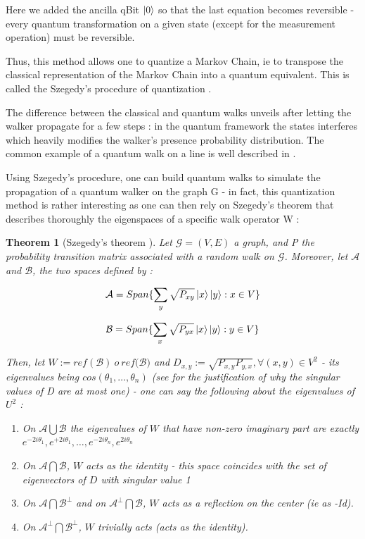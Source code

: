 \documentclass[sn-mathphys]{sn-jnl}%
\theoremstyle{thmstyleone}%
\newtheorem{theo}{Theorem}[section]
\theoremstyle{thmstyletwo}%
\theoremstyle{thmstylethree}%
\begin{document}
Here we added the ancilla qBit $\ket{0}$ so that the last equation
becomes reversible - every quantum transformation on a given state
(except for the measurement operation) must be reversible.

Thus, this method allows one to quantize a Markov Chain, ie to
transpose the classical representation of the Markov Chain into a
quantum equivalent. This is called the Szegedy's procedure of
quantization \cite{szegedy}.

The difference between the classical and quantum walks unveils after
letting the walker propagate for a few steps : in the quantum
framework the states interferes which heavily modifies the walker's
presence probability distribution. The common example of a quantum
walk on a line is well described in \cite{kempe_2009}.

Using Szegedy's procedure, one can build quantum walks to simulate the
propagation of a quantum walker on the graph G - in fact, this
quantization method is rather interesting as one can then rely on
Szegedy's theorem that describes thoroughly the eigenspaces of a
specific walk operator W :

\begin{theo}[Szegedy's theorem \cite{szegedy}]
  Let $\mathcal{G}=(V,E)$ a graph, and P the probability transition
  matrix associated with a random walk on $\mathcal{G}$. Moreover, let
  $\mathcal{A}$ and $\mathcal{B}$, the two spaces defined by :

\begin{equation*}
    \mathcal{A} = Span\{\sum_y \sqrt{P_{xy}} \ket{x} \ket{y} : x \in V\}
\end{equation*}

\begin{equation*}
    \mathcal{B} = Span\{\sum_x \sqrt{P_{yx}} \ket{x} \ket{y} : y \in V\}
\end{equation*}

Then, let $W := ref(\mathcal{B})\ o \ ref(\mathcal{B)}$ and
$D_{x,y} := \sqrt{P_{x,y}P_{y,x}}, \forall (x,y) \in V^2$ - its
eigenvalues being $cos(\theta_1, \hdots, \theta_n)$ (see
\cite{szegedy} for the justification of why the singular values of D
are at most one) - one can say the following about the eigenvalues of
$U^2$ :

\begin{enumerate}
\item On $\mathcal{A} \bigcup \mathcal{B}$ the eigenvalues of $W$ that
  have non-zero imaginary part are exactly
  $e^{-2i\theta_1}, e^{+2i\theta_1}, \hdots, e^{-2i\theta_n},
  e^{2i\theta_n}$
\item On $\mathcal{A} \bigcap \mathcal{B}$, $W$ acts as the
  identity - this space coincides with the set of eigenvectors of
  $D$ with singular value 1
\item On $\mathcal{A} \bigcap \mathcal{B}^{\perp}$ and on
  $\mathcal{A}^{\perp} \bigcap \mathcal{B}$, $W$ acts as a reflection
  on the center (ie as -Id).
\item On $\mathcal{A}^{\perp} \bigcap \mathcal{B}^{\perp}$, $W$
  trivially acts (acts as the identity).
\end{enumerate}

\end{theo}
 
\end{document}
